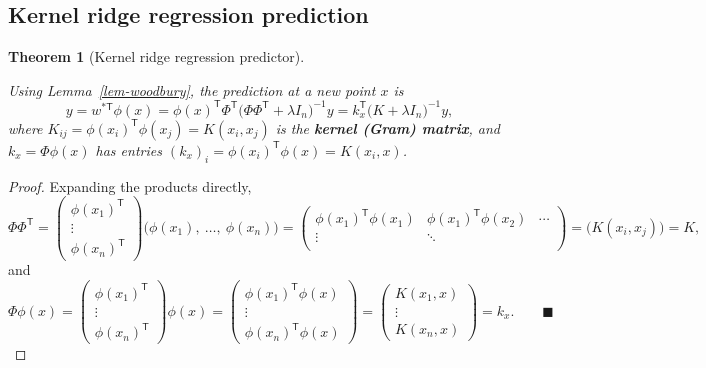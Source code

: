 \documentclass[
  letterpaper,
  DIV=11,
  numbers=noendperiod]{scrreprt}
\theoremstyle{definition}
\theoremstyle{plain}
\newtheorem{theorem}{Theorem}[chapter]
\theoremstyle{plain}
\theoremstyle{definition}
\theoremstyle{plain}
\theoremstyle{plain}
\theoremstyle{remark}
\begin{document}
\subsection{Kernel ridge regression
prediction}\label{kernel-ridge-regression-prediction}

\begin{theorem}[Kernel ridge regression
predictor]\protect\hypertarget{thm-kernel-prediction}{}\label{thm-kernel-prediction}

Using Lemma~\ref{lem-woodbury}, the prediction at a new point \(x\) is
\[
y = w^{\ast\mathsf T}\phi(x)
= \phi(x)^{\mathsf T} \Phi^{\mathsf T}\big(\Phi\Phi^{\mathsf T} + \lambda I_n\big)^{-1} y
= k_x^{\mathsf T}\big(K + \lambda I_n\big)^{-1} y ,
\] where \(K_{ij} = \phi(x_i)^{\mathsf T}\phi(x_j) = K(x_i, x_j)\) is
the \textbf{kernel (Gram) matrix}, and \(k_x = \Phi\phi(x)\) has entries
\((k_x)_i = \phi(x_i)^{\mathsf T}\phi(x) = K(x_i, x)\).

\end{theorem}

\begin{proof}
Expanding the products directly, \[
\Phi\Phi^{\mathsf T}
= \begin{pmatrix} \phi(x_1)^{\mathsf T} \\ \vdots \\ \phi(x_n)^{\mathsf T} \end{pmatrix}
\big(\phi(x_1), \ \dots, \ \phi(x_n)\big)
= \begin{pmatrix}
\phi(x_1)^{\mathsf T}\phi(x_1) & \phi(x_1)^{\mathsf T}\phi(x_2) & \cdots \\
\vdots & \ddots & \\
\end{pmatrix}
= \big(K(x_i, x_j)\big) = K ,
\] and \[
\Phi\phi(x)
= \begin{pmatrix} \phi(x_1)^{\mathsf T} \\ \vdots \\ \phi(x_n)^{\mathsf T} \end{pmatrix} \phi(x)
= \begin{pmatrix} \phi(x_1)^{\mathsf T}\phi(x) \\ \vdots \\ \phi(x_n)^{\mathsf T}\phi(x) \end{pmatrix}
= \begin{pmatrix} K(x_1, x) \\ \vdots \\ K(x_n, x) \end{pmatrix} = k_x . \qquad\blacksquare
\]
\end{proof}
\end{document}
